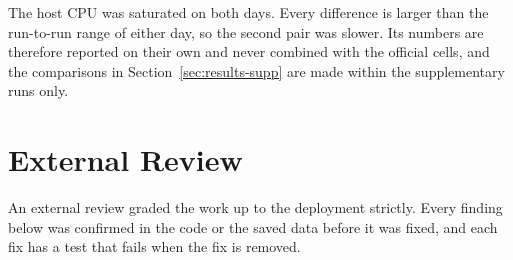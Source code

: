 \documentclass[a4paper]{report}
\begin{document}
The host CPU was saturated on both days. Every difference is larger than the
run-to-run range of either day, so the second pair was slower. Its numbers are
therefore reported on their own and never combined with the official cells,
and the comparisons in Section~\ref{sec:results-supp} are made within the
supplementary runs only.

\begin{table}[H]
\centering
\small

\caption{The same cell (C2, 100/s, 100,000 units, three runs each) on the
official and supplementary host pairs. Cells:
median of 3 runs (range).}
\label{tab:supp-anchor}
\end{table}

\chapter{External Review}
\label{sec:review-fixes}

An external review graded the work up to the deployment strictly. Every finding below was
confirmed in the code or the saved data before it was fixed, and each fix has
a test that fails when the fix is removed.
\end{document}
